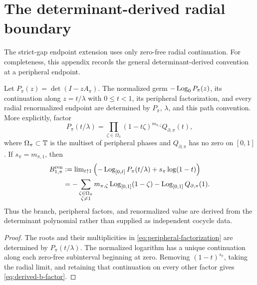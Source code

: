 \section{The determinant-derived radial boundary}
\label{app:radial-boundary}

The strict-gap endpoint extension uses only zero-free radial continuation.  For
completeness, this appendix records the general determinant-derived convention
at a peripheral endpoint.

\begin{proposition}
\label{prop:derived-boundary}
Let \(P_\pi(z)=\det(I-zA_\pi)\).  The normalized germ
\(-\operatorname{Log}_0P_\pi(z)\), its continuation along \(z=t/\lambda\) with
\(0\leq t<1\), its peripheral factorization, and every radial renormalized
endpoint are determined by \(P_\pi\), \(\lambda\), and this path convention.
More explicitly, factor
\begin{equation}\label{eq:peripheral-factorization}
  P_\pi(t/\lambda)
   =\prod_{\zeta\in\Omega_\pi}(1-t\zeta)^{m_{\pi,\zeta}}
      Q_{\partial,\pi}(t),
\end{equation}
where \(\Omega_\pi\subset\mathbb{T}\) is the multiset of peripheral phases and
\(Q_{\partial,\pi}\) has no zero on \([0,1]\).  If
\(s_\pi=m_{\pi,1}\), then
\begin{align}
  B_{1,\pi}^{\mathrm{ren}}
  &:={\lim}_{t\uparrow1}
     \left(-\operatorname{Log}_{[0,t]}P_\pi(t/\lambda)+s_\pi\log(1-t)\right)
     \label{eq:derived-b-ren}\\
  &=-\sum_{\substack{\zeta\in\Omega_\pi\\\zeta\neq1}}
       m_{\pi,\zeta}\operatorname{Log}_{[0,1]}(1-\zeta)
     -\operatorname{Log}_{[0,1]}Q_{\partial,\pi}(1).
     \label{eq:derived-b-factor}
\end{align}
Thus the branch, peripheral factors, and renormalized value are derived from
the determinant polynomial rather than supplied as independent cocycle data.
\end{proposition}

\begin{proof}
The roots and their multiplicities in \eqref{eq:peripheral-factorization}
are determined by \(P_\pi(t/\lambda)\).  The normalized logarithm has a unique
continuation along each zero-free subinterval beginning at zero.  Removing
\((1-t)^{s_\pi}\), taking the radial limit, and retaining that continuation
on every other factor gives \eqref{eq:derived-b-factor}.
\end{proof}
